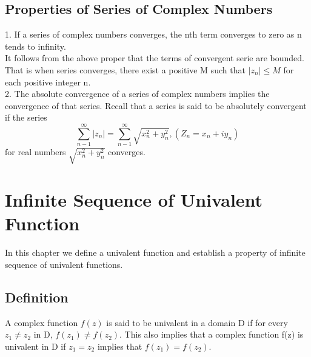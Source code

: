 \documentclass[a4paper, 12pt]{report}
\begin{document}
{\section{Properties of Series of Complex Numbers}
1. If a series of complex numbers converges, the nth term converges to zero as n tends to infinity.\\
It follows from the above proper that the terms of convergent serie are bounded. That is when series converges, there exist a positive M such that $|z_n| \leq M$ for each positive integer n.\\
2. The absolute convergence of a series of complex numbers implies the convergence of that series. Recall that a series is said to be absolutely convergent if the series 
\begin{equation*}
\sum^\infty_{n-1}|z_n| = \sum^\infty_{n-1}\sqrt{x_n^2 + y_n^2}, (Z_n = x_n + iy_n)
\end{equation*}
for real numbers $\sqrt{x_n^2 + y_n^2}$ converges.

\newpage
\chapter{Infinite Sequence of Univalent Function}
In this chapter we define a univalent function and establish a property of infinite sequence of univalent functions.
\section{Definition}
A complex function $f(z)$ is said to be univalent in a domain D if for every $z_1 \neq z_2$ in D, $f(z_1) \neq f(z_2)$. This also implies that a complex function f(z) is univalent in D if $z_1 = z_2$ implies that $f(z_1) = f(z_2)$.
}
\end{document}
